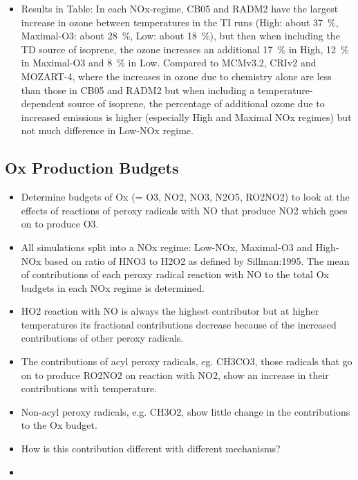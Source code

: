 \documentclass[11pt,a4paper]{article}
\begin{document}
\begin{itemize}
    \item Results in Table: In each NOx-regime, CB05 and RADM2 have the largest increase in ozone between temperatures in the TI runs (High: about 37~\%, Maximal-O3: about 28~\%, Low: about 18~\%), but then when including the TD source of isoprene, the ozone increases an additional 17~\% in High, 12~\% in Maximal-O3 and 8~\% in Low. Compared to MCMv3.2, CRIv2 and MOZART-4, where the increases in ozone due to chemistry alone are less than those in CB05 and RADM2 but when including a temperature-dependent source of isoprene, the percentage of additional ozone due to increased emissions is higher (especially High and Maximal NOx regimes) but not much difference in Low-NOx regime.
\end{itemize}

\subsection{Ox Production Budgets}
\begin{itemize}
    \item Determine budgets of  Ox (= O3, NO2, NO3, N2O5, RO2NO2) to look at the effects of reactions of peroxy radicals with NO that produce NO2 which goes on to produce O3.
    \item All simulations split into a NOx regime: Low-NOx, Maximal-O3 and High-NOx based on ratio of HNO3 to H2O2 as defined by Sillman:1995. The mean of contributions of each peroxy radical reaction with NO to the total Ox budgets in each NOx regime is determined.
    \item HO2 reaction with NO is always the highest contributor but at higher temperatures its fractional contributions decrease because of the increased contributions of other peroxy radicals.
    \item The contributions of acyl peroxy radicals, eg. CH3CO3, those radicals that go on to produce RO2NO2 on reaction with NO2, show an increase in their contributions with temperature.
    \item Non-acyl peroxy radicals, e.g. CH3O2, show little change in the contributions to the Ox budget.
    \item \color{red}How is this contribution different with different mechanisms?
    \item \color{red}{Quantitive results}
\end{itemize}
\end{document}
